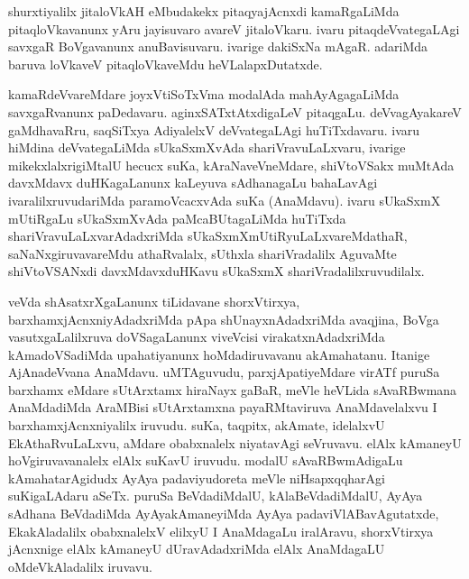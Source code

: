 \begin{artha}
shurxtiyalilx jitaloVkAH eMbudakekx pitaqyajAcnxdi kamaRgaLiMda pitaqloVkavanunx yAru jayisuvaro avareV jitaloVkaru. ivaru pitaqdeVvategaLAgi savxgaR BoVgavanunx anuBavisuvaru. ivarige dakiSxNa mAgaR. adariMda baruva loVkaveV pitaqloVkaveMdu heVLalapxDutatxde. 
\end{artha}

\begin{artha}
kamaRdeVvareMdare joyxVtiSoTxVma modalAda mahAyAgagaLiMda savxgaRvanunx paDedavaru. aginxSATxtAtxdigaLeV pitaqgaLu. deVvagAyakareV gaMdhavaRru, saqSiTxya AdiyalelxV deVvategaLAgi huTiTxdavaru. ivaru hiMdina deVvategaLiMda sUkaSxmXvAda shariVravuLaLxvaru, ivarige mikekxlalxrigiMtalU hecucx suKa, kAraNaveVneMdare, shiVtoVSakx muMtAda davxMdavx duHKagaLanunx kaLeyuva sAdhanagaLu bahaLavAgi ivaralilxruvudariMda paramoVcacxvAda suKa (AnaMdavu). ivaru sUkaSxmX mUtiRgaLu sUkaSxmXvAda paMcaBUtagaLiMda huTiTxda shariVravuLaLxvarAdadxriMda sUkaSxmXmUtiRyuLaLxvareMdathaR, saNaNxgiruvavareMdu athaRvalalx, sUthxla shariVradalilx AguvaMte shiVtoVSANxdi davxMdavxduHKavu sUkaSxmX shariVradalilxruvudilalx. 
\end{artha}%

\begin{artha}
veVda shAsatxrXgaLanunx tiLidavane shorxVtirxya, barxhamxjAcnxniyAdadxriMda pApa shUnayxnAdadxriMda avaqjina, BoVga vasutxgaLalilxruva doVSagaLanunx viveVcisi virakatxnAdadxriMda kAmadoVSadiMda upahatiyanunx hoMdadiruvavanu akAmahatanu. Itanige AjAnadeVvana AnaMdavu. uMTAguvudu, parxjApatiyeMdare virATf puruSa barxhamx eMdare sUtArxtamx hiraNayx gaBaR, meVle heVLida sAvaRBwmana AnaMdadiMda AraMBisi sUtArxtamxna payaRMtaviruva AnaMdavelalxvu I barxhamxjAcnxniyalilx iruvudu. suKa, taqpitx, akAmate, idelalxvU EkAthaRvuLaLxvu, aMdare obabxnalelx niyatavAgi seVruvavu. elAlx kAmaneyU hoVgiruvavanalelx elAlx suKavU iruvudu. modalU sAvaRBwmAdigaLu kAmahatarAgidudx AyAya padaviyudoreta meVle niHsapxqqharAgi suKigaLAdaru aSeTx. puruSa BeVdadiMdalU, kAlaBeVdadiMdalU, AyAya sAdhana BeVdadiMda AyAyakAmaneyiMda AyAya padaviVlABavAgutatxde, EkakAladalilx obabxnalelxV elilxyU I AnaMdagaLu iralAravu, shorxVtirxya jAcnxnige elAlx kAmaneyU dUravAdadxriMda elAlx AnaMdagaLU oMdeVkAladalilx iruvavu.
\end{artha}


